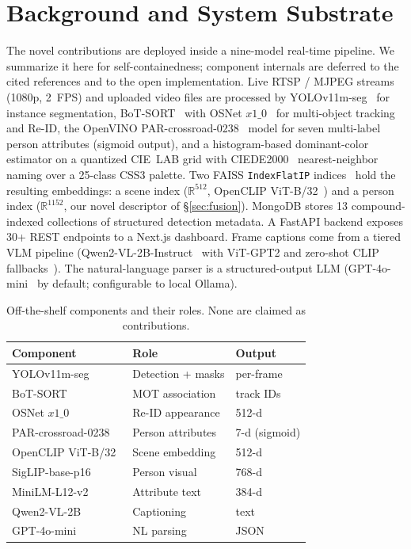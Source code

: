 ﻿\documentclass[conference]{IEEEtran}
\theoremstyle{definition}
\begin{document}
\section{Background and System Substrate}

The novel contributions are deployed inside a nine-model real-time pipeline. We summarize it here for self-containedness; component internals are deferred to the cited references and to the open implementation. Live RTSP / MJPEG streams (1080p, 2~FPS) and uploaded video files are processed by YOLOv11m-seg~\cite{b14} for instance segmentation, BoT-SORT~\cite{b22} with OSNet $x1\_0$~\cite{b22b} for multi-object tracking and Re-ID, the OpenVINO PAR-crossroad-0238~\cite{b15} model for seven multi-label person attributes (sigmoid output), and a histogram-based dominant-color estimator on a quantized CIE~LAB grid with CIEDE2000~\cite{b16} nearest-neighbor naming over a 25-class CSS3 palette. Two FAISS \texttt{IndexFlatIP} indices~\cite{b25} hold the resulting embeddings: a scene index ($\mathbb{R}^{512}$, OpenCLIP ViT-B/32~\cite{b18b}) and a person index ($\mathbb{R}^{1152}$, our novel descriptor of \S\ref{sec:fusion}). MongoDB stores 13 compound-indexed collections of structured detection metadata. A FastAPI backend exposes 30+ REST endpoints to a Next.js dashboard. Frame captions come from a tiered VLM pipeline (Qwen2-VL-2B-Instruct~\cite{b17} with ViT-GPT2 and zero-shot CLIP fallbacks~\cite{b18,b18b,b19}). The natural-language parser is a structured-output LLM (GPT-4o-mini~\cite{b20} by default; configurable to local Ollama).

\begin{table}[!t]
\caption{Off-the-shelf components and their roles. None are claimed as contributions.}
\label{tab:models}
\centering
\footnotesize
\begin{tabular}{@{}lll@{}}
\toprule
Component & Role & Output \\
\midrule
YOLOv11m-seg~\cite{b14}     & Detection + masks       & per-frame \\
BoT-SORT~\cite{b22}          & MOT association         & track IDs \\
OSNet $x1\_0$~\cite{b22b}    & Re-ID appearance        & 512-d \\
PAR-crossroad-0238~\cite{b15}& Person attributes       & 7-d (sigmoid) \\
OpenCLIP ViT-B/32~\cite{b18b}& Scene embedding         & 512-d \\
SigLIP-base-p16~\cite{b24}   & Person visual           & 768-d \\
MiniLM-L12-v2~\cite{b23}     & Attribute text          & 384-d \\
Qwen2-VL-2B~\cite{b17}       & Captioning              & text \\
GPT-4o-mini~\cite{b20}       & NL parsing              & JSON \\
\bottomrule
\end{tabular}
\end{table}
\end{document}
